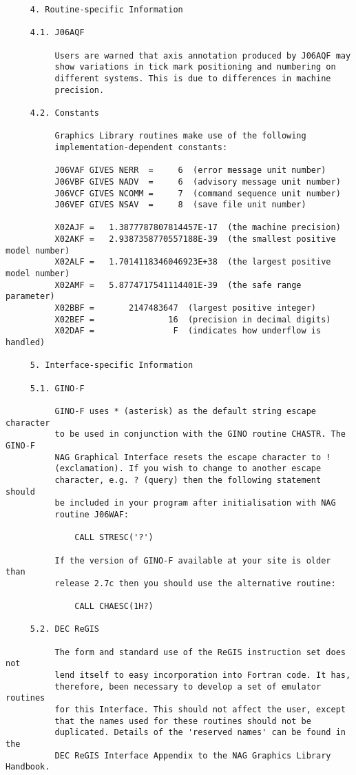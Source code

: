 \begin{verbatim}
     4. Routine-specific Information

     4.1. J06AQF

          Users are warned that axis annotation produced by J06AQF may
          show variations in tick mark positioning and numbering on
          different systems. This is due to differences in machine
          precision.

     4.2. Constants

          Graphics Library routines make use of the following
          implementation-dependent constants:

          J06VAF GIVES NERR  =     6  (error message unit number)
          J06VBF GIVES NADV  =     6  (advisory message unit number)
          J06VCF GIVES NCOMM =     7  (command sequence unit number)
          J06VEF GIVES NSAV  =     8  (save file unit number)

          X02AJF =   1.3877787807814457E-17  (the machine precision)
          X02AKF =   2.9387358770557188E-39  (the smallest positive model number)
          X02ALF =   1.7014118346046923E+38  (the largest positive model number)
          X02AMF =   5.8774717541114401E-39  (the safe range parameter)
          X02BBF =       2147483647  (largest positive integer)
          X02BEF =               16  (precision in decimal digits)
          X02DAF =                F  (indicates how underflow is handled)

     5. Interface-specific Information

     5.1. GINO-F

          GINO-F uses * (asterisk) as the default string escape character
          to be used in conjunction with the GINO routine CHASTR. The GINO-F
          NAG Graphical Interface resets the escape character to !
          (exclamation). If you wish to change to another escape
          character, e.g. ? (query) then the following statement should
          be included in your program after initialisation with NAG
          routine J06WAF:

              CALL STRESC('?')

          If the version of GINO-F available at your site is older than
          release 2.7c then you should use the alternative routine:

              CALL CHAESC(1H?)

     5.2. DEC ReGIS

          The form and standard use of the ReGIS instruction set does not
          lend itself to easy incorporation into Fortran code. It has,
          therefore, been necessary to develop a set of emulator routines
          for this Interface. This should not affect the user, except
          that the names used for these routines should not be
          duplicated. Details of the 'reserved names' can be found in the
          DEC ReGIS Interface Appendix to the NAG Graphics Library Handbook.


\end{verbatim}
